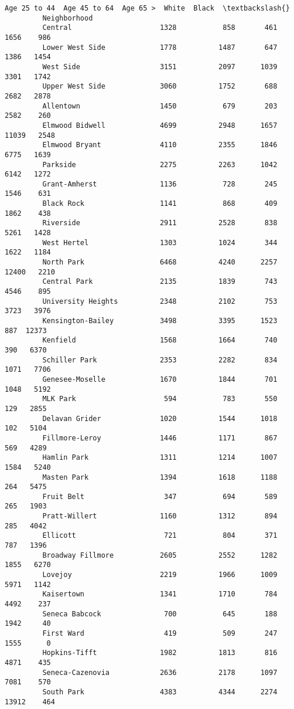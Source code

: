 \documentclass[11pt]{article}
\begin{document}
\begin{Verbatim}[commandchars=\\\{\}]
                             Age 25 to 44  Age 45 to 64  Age 65 >  White  Black  \textbackslash{}
         Neighborhood                                                             
         Central                     1328           858       461   1656    986   
         Lower West Side             1778          1487       647   1386   1454   
         West Side                   3151          2097      1039   3301   1742   
         Upper West Side             3060          1752       688   2682   2878   
         Allentown                   1450           679       203   2582    260   
         Elmwood Bidwell             4699          2948      1657  11039   2548   
         Elmwood Bryant              4110          2355      1846   6775   1639   
         Parkside                    2275          2263      1042   6142   1272   
         Grant-Amherst               1136           728       245   1546    631   
         Black Rock                  1141           868       409   1862    438   
         Riverside                   2911          2528       838   5261   1428   
         West Hertel                 1303          1024       344   1622   1184   
         North Park                  6468          4240      2257  12400   2210   
         Central Park                2135          1839       743   4546    895   
         University Heights          2348          2102       753   3723   3976   
         Kensington-Bailey           3498          3395      1523    887  12373   
         Kenfield                    1568          1664       740    390   6370   
         Schiller Park               2353          2282       834   1071   7706   
         Genesee-Moselle             1670          1844       701   1048   5192   
         MLK Park                     594           783       550    129   2855   
         Delavan Grider              1020          1544      1018    102   5104   
         Fillmore-Leroy              1446          1171       867    569   4289   
         Hamlin Park                 1311          1214      1007   1584   5240   
         Masten Park                 1394          1618      1188    264   5475   
         Fruit Belt                   347           694       589    265   1903   
         Pratt-Willert               1160          1312       894    285   4042   
         Ellicott                     721           804       371    787   1396   
         Broadway Fillmore           2605          2552      1282   1855   6270   
         Lovejoy                     2219          1966      1009   5971   1142   
         Kaisertown                  1341          1710       784   4492    237   
         Seneca Babcock               700           645       188   1942     40   
         First Ward                   419           509       247   1555      0   
         Hopkins-Tifft               1982          1813       816   4871    435   
         Seneca-Cazenovia            2636          2178      1097   7081    570   
         South Park                  4383          4344      2274  13912    464   
         

\end{Verbatim}
\end{document}
